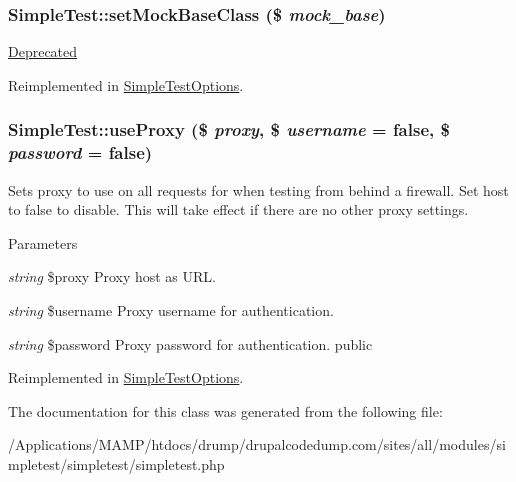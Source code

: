 \hypertarget{class_simple_test_a6bfdc0adde3e11f041872bbacd773fdf}{
\subsubsection[{setMockBaseClass}]{\setlength{\rightskip}{0pt plus 5cm}SimpleTest::setMockBaseClass (\$ {\em mock\_\-base})}}
\label{class_simple_test_a6bfdc0adde3e11f041872bbacd773fdf}
\begin{Desc}
\item[\hyperlink{deprecated__deprecated000006}{Deprecated}]\end{Desc}


Reimplemented in \hyperlink{class_simple_test_options_abd99206b992d90ce1de9edbf4efceabb}{SimpleTestOptions}.\hypertarget{class_simple_test_a40777a990732860c647bea8c7aa7f753}{
\subsubsection[{useProxy}]{\setlength{\rightskip}{0pt plus 5cm}SimpleTest::useProxy (\$ {\em proxy}, \/  \$ {\em username} = {\ttfamily false}, \/  \$ {\em password} = {\ttfamily false})}}
\label{class_simple_test_a40777a990732860c647bea8c7aa7f753}
Sets proxy to use on all requests for when testing from behind a firewall. Set host to false to disable. This will take effect if there are no other proxy settings. 
\begin{DoxyParams}{Parameters}
\item[{\em string}]\$proxy Proxy host as URL. \item[{\em string}]\$username Proxy username for authentication. \item[{\em string}]\$password Proxy password for authentication.  public \end{DoxyParams}


Reimplemented in \hyperlink{class_simple_test_options_a6d722d3083d23b8ad3a59813aba88bb4}{SimpleTestOptions}.

The documentation for this class was generated from the following file:\begin{DoxyCompactItemize}
\item 
/Applications/MAMP/htdocs/drump/drupalcodedump.com/sites/all/modules/simpletest/simpletest/simpletest.php\end{DoxyCompactItemize}
